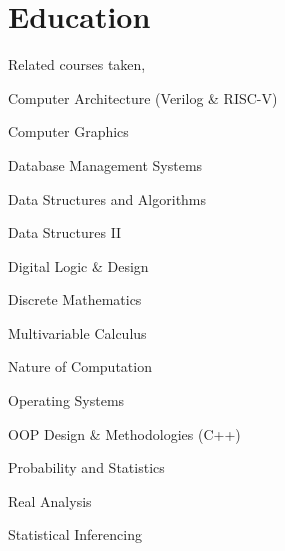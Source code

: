 \documentclass[]{resume}
\begin{document}
\begin{minipage}[t]{0.5\textwidth}
    \section{Education}
     
    Related courses taken,
    \begin{tightemize}
        \item Computer Architecture (Verilog \& RISC-V)
        \item Computer Graphics
        \item Database Management Systems
        \item Data Structures and Algorithms
        \item Data Structures II
        \item Digital Logic \& Design
        \item Discrete Mathematics
        \item Multivariable Calculus
        \item Nature of Computation
        \item Operating Systems
        \item OOP Design \& Methodologies (C++)
        \item Probability and Statistics
        \item Real Analysis
        \item Statistical Inferencing
    \end{tightemize}


\end{minipage}
\end{document}
